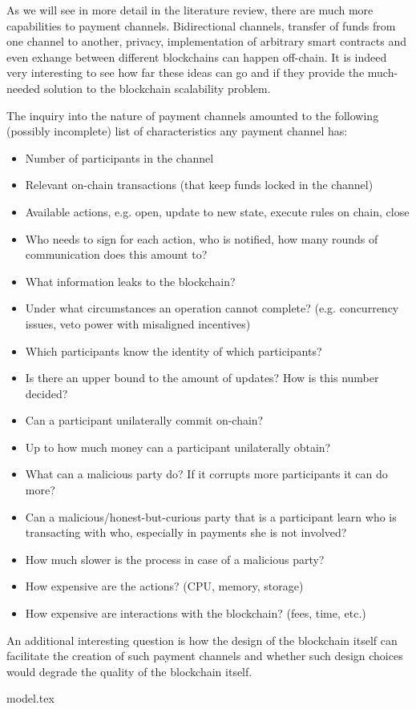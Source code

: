  As we will see in more detail in the literature review, there are much more capabilities
  to payment channels. Bidirectional channels, transfer of funds from one channel to
  another, privacy, implementation of arbitrary smart contracts and even exhange between
  different blockchains can happen off-chain. It is indeed very interesting to see how far
  these ideas can go and if they provide the much-needed solution to the blockchain
  scalability problem.

  The inquiry into the nature of payment channels amounted to the following (possibly
  incomplete) list of characteristics any payment channel has:
  \begin{itemize}
    \item Number of participants in the channel
    \item Relevant on-chain transactions (that keep funds locked in the channel)
    \item Available actions, e.g. open, update to new state, execute rules on chain, close
    \item Who needs to sign for each action, who is notified, how many rounds of
    communication does this amount to?
    \item What information leaks to the blockchain?
    \item Under what circumstances an operation cannot complete? (e.g. concurrency issues,
    veto power with misaligned incentives)
    \item Which participants know the identity of which participants?
    \item Is there an upper bound to the amount of updates? How is this number decided?
    \item Can a participant unilaterally commit on-chain?
    \item Up to how much money can a participant unilaterally obtain?
    \item What can a malicious party do? If it corrupts more participants it can do more?
    \item Can a malicious/honest-but-curious party that is a participant learn who is
    transacting with who, especially in payments she is not involved?
    \item How much slower is the process in case of a malicious party?
    \item How expensive are the actions? (CPU, memory, storage)
    \item How expensive are interactions with the blockchain? (fees, time, etc.)
  \end{itemize}

  An additional interesting question is how the design of the blockchain itself can
  facilitate the creation of such payment channels and whether such design choices would
  degrade the quality of the blockchain itself.

  {model.tex}
